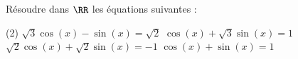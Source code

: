 %
%
	Résoudre dans $\RR$ les équations suivantes :
	\begin{tasks}(2)
		\task $\sqrt{3} \cos(x) - \sin(x) = \sqrt{2}$
	    \task $\cos(x) + \sqrt{3}\sin(x) = 1$
	    \task $\sqrt{2}\cos(x) + \sqrt{2}\sin(x) = -1$
	    \task $\cos(x) + \sin(x) = 1$
	\end{tasks}
